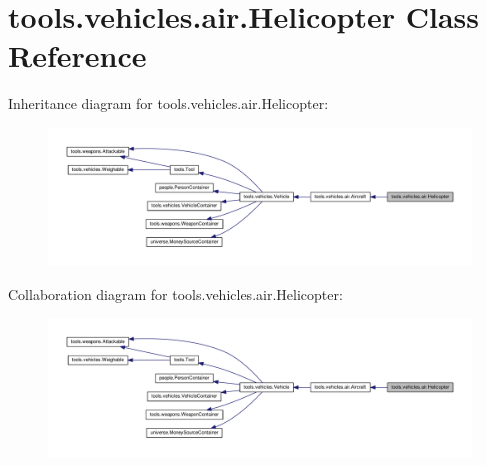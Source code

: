 \hypertarget{classtools_1_1vehicles_1_1air_1_1_helicopter}{}\section{tools.\+vehicles.\+air.\+Helicopter Class Reference}
\label{classtools_1_1vehicles_1_1air_1_1_helicopter}


Inheritance diagram for tools.\+vehicles.\+air.\+Helicopter\+:
\nopagebreak
\begin{figure}[H]
\begin{center}
\leavevmode
\includegraphics[width=350pt]{classtools_1_1vehicles_1_1air_1_1_helicopter__inherit__graph}
\end{center}
\end{figure}


Collaboration diagram for tools.\+vehicles.\+air.\+Helicopter\+:
\nopagebreak
\begin{figure}[H]
\begin{center}
\leavevmode
\includegraphics[width=350pt]{classtools_1_1vehicles_1_1air_1_1_helicopter__coll__graph}
\end{center}
\end{figure}
